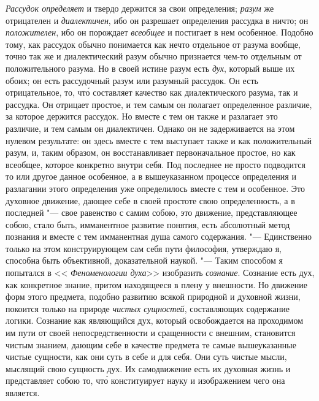 {\em Рассудок определяет} и твердо держится за свои определения; {\em разум} же
отрицателен и {\em диалектичен}, ибо он разрешает определения рассудка в ничто;
он {\em положителен}, ибо он порождает {\em всеобщее} и постигает в нем
особенное. Подобно тому, как рассудок обычно понимается как нечто отдельное от
разума вообще, точно так же и диалектический разум обычно признается чем-то
отдельным от положительного разума. Но в своей истине разум есть {\em дух},
который выше их обоих; он есть рассудочный разум или разумный рассудок. Он есть
отрицательное, то, чт\'{о} составляет качество как диалектического разума, так
и рассудка. Он отрицает простое, и тем самым он полагает определенное различие,
за которое держится рассудок. Но вместе с тем он также и разлагает это
различие, и тем самым он диалектичен. Однако он не задерживается на этом
нулевом результате: он здесь вместе с тем выступает также и как положительный
разум, и, таким образом, он восстанавливает первоначальное простое, но как
всеобщее, которое конкретно внутри себя. Под последнее не просто подводится то
или другое данное особенное, а в вышеуказанном процессе определения и
разлагании этого определения уже определилось вместе с тем и особенное. Это
духовное движение, дающее себе в своей простоте свою определенность, а в
последней "--- свое равенство с самим собою, это движение, представляющее
собою, стало быть, имманентное развитие понятия, есть абсолютный метод познания
и вместе с тем имманентная душа самого содержания. "--- Единственно только на
этом конструирующем сам себя пути философия, утверждаю я, способна быть
объективной, доказательной наукой. "--- Таким способом я попытался в <<{\em
Феноменологии духа}>> изобразить {\em сознание}. Сознание есть дух, как
конкретное знание, притом находящееся в плену у внешности. Но движение форм
этого предмета, подобно развитию всякой природной и духовной жизни, покоится
только на природе {\em чистых сущностей}, составляющих содержание логики.
Сознание как являющийся дух, который освобождается на проходимом им пути от
своей непосредственности и сращенности с внешним, становится чистым знанием,
дающим себе в качестве предмета те самые вышеуказанные чистые сущности, как они
суть в себе и для себя. Они суть чистые мысли, мыслящий свою сущность дух. Их
самодвижение есть их духовная жизнь и представляет собою то, чт\'{о}
конституирует науку и изображением чего она является.

